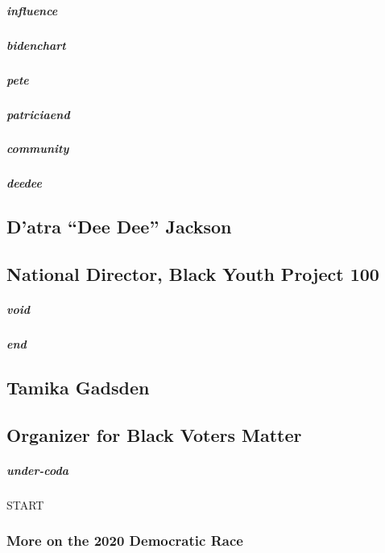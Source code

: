 \hypertarget{influence}{%
\subparagraph{influence}\label{influence}}

\hypertarget{bidenchart}{%
\subparagraph{bidenchart}\label{bidenchart}}

\hypertarget{pete}{%
\subparagraph{pete}\label{pete}}

\hypertarget{patriciaend}{%
\subparagraph{patriciaend}\label{patriciaend}}

\hypertarget{community}{%
\subparagraph{community}\label{community}}

\hypertarget{deedee}{%
\subparagraph{deedee}\label{deedee}}

\hypertarget{datra-dee-dee-jackson}{%
\subsection{D'atra ``Dee Dee'' Jackson}\label{datra-dee-dee-jackson}}

\hypertarget{national-director-black-youth-project-100}{%
\subsection{National Director, Black Youth Project
100}\label{national-director-black-youth-project-100}}

\hypertarget{void}{%
\subparagraph{void}\label{void}}

\hypertarget{end}{%
\subparagraph{end}\label{end}}

\hypertarget{tamika-gadsden}{%
\subsection{Tamika Gadsden}\label{tamika-gadsden}}

\hypertarget{organizer-for-black-voters-matter}{%
\subsection{Organizer for Black Voters
Matter}\label{organizer-for-black-voters-matter}}

\hypertarget{under-coda}{%
\subparagraph{under-coda}\label{under-coda}}

START

\hypertarget{more-on-the-2020-democratic-race}{%
\subsubsection{More on the 2020 Democratic
Race}\label{more-on-the-2020-democratic-race}}

